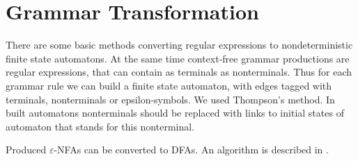 \documentclass[runningheads,a4paper]{llncs}
\begin{document}
\begin{algorithmic}   
    \Else
    
    \If{($\beta = \epsilon$)}
    \Else
    \EndIf
    
    
    
    \EndIf
    
    
    \EndIf
    
    \Else
    \EndIf
    
    \EndIf
    
    \EndIf
    
    \EndIf
    \EndFunction
\end{algorithmic}

\section{Grammar Transformation}%

There are some basic methods converting regular expressions to nondeterministic finite state automatons. 
At the same time context-free grammar productions are regular expressions, that can contain as terminals 
as nonterminals. Thus for each grammar rule we can build a finite state automaton, with edges tagged with 
terminals, nonterminals or epsilon-symbols. We used Thompson's method\cite{Thompson:1968:PTR:363347.363387}. 
In built automatons nonterminals should be replaced with links to initial states of automaton that stands 
for this nonterminal.

Produced $\varepsilon$-NFAs can be converted to DFAs. An algorithm is described in \cite{aho1974design}.
\end{document}
